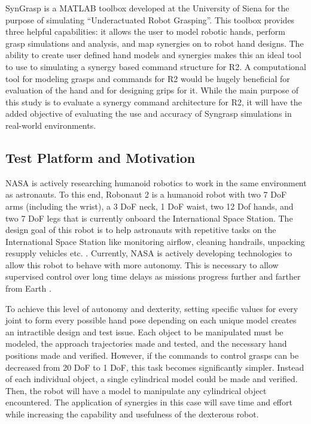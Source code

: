 \documentclass[letterpaper, 10 pt, conference]{ieeeconf}  %
\begin{document}
	SynGrasp is a MATLAB toolbox developed at the University of Siena \cite{syngrasp} for the purpose of simulating “Underactuated Robot Grasping”.  This toolbox provides three helpful capabilities: it allows the user to model robotic hands, perform grasp simulations and analysis, and map synergies on to robot hand designs.   The ability to create user defined hand models and synergies makes this an ideal tool to use to simulating a synergy based command structure for R2.  A computational tool for modeling grasps and commands for R2 would be hugely beneficial for evaluation of the hand and for designing grips for it.  While the main purpose of this study is to evaluate a synergy command architecture for R2, it will have the added objective of evaluating the use and accuracy of Syngrasp simulations in real-world environments.

\subsection{Test Platform and Motivation}
NASA is actively researching humanoid robotics to work in the same environment as astronauts. To this end, Robonaut 2 is a humanoid robot with two 7 DoF arms (including the wrist), a 3 DoF neck, 1 DoF waist, two 12 Dof hands, and two 7 DoF legs that is currently onboard the International Space Station. The design goal of this robot is to help astronauts with repetitive tasks on the International Space Station like monitoring airflow, cleaning handrails, unpacking resupply vehicles etc. \cite{r2_diftler}. Currently, NASA is actively developing technologies to allow this robot to behave with more autonomy. This is necessary to allow supervised control over long time delays as missions progress further and farther from Earth \cite{Farrell}. 

To achieve this level of autonomy and dexterity, setting specific values for every joint to form every possible hand pose depending on each unique model creates an intractible design and test issue. Each object to be manipulated must be modeled, the approach trajectories made and tested, and the necessary hand positions made and verified. However, if the commands to control grasps can be decreased from 20 DoF to 1 DoF, this task becomes significantly simpler. Instead of each individual object, a single cylindrical model could be made and verified. Then, the robot will have a model to manipulate any cylindrical object encountered. The application of synergies in this case will save time and effort while increasing the capability and usefulness of the dexterous robot.   
\end{document}
